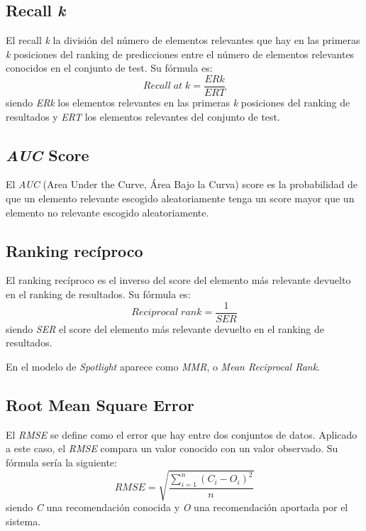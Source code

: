 \subsection{Recall \textit{k}}\label{recall-k}
El recall \textit{k} \cite{recall_at_k} la división del número de elementos relevantes que hay en las primeras \textit{k} posiciones del ranking de predicciones entre el número de elementos relevantes conocidos en el conjunto de test. Su fórmula es:
\begin{equation}
Recall\;at\;k = \frac{ERk}{ERT}
\end{equation}
siendo \textit{ERk} los elementos relevantes en las primeras \textit{k} posiciones del ranking de resultados y \textit{ERT} los elementos relevantes del conjunto de test.

\subsection{\textit{AUC} Score}\label{auc-score}
El \textit{AUC} (Area Under the Curve, Área Bajo la Curva) score \cite{auc_score} es la probabilidad de que un elemento relevante escogido aleatoriamente tenga un score mayor que un elemento no relevante escogido aleatoriamente.

\subsection{Ranking recíproco}\label{ranking-reciproco}
El ranking recíproco \cite{reciprocal_rank} es el inverso del score del elemento más relevante devuelto en el ranking de resultados. Su fórmula es:
\begin{equation}
Reciprocal\;rank = \frac{1}{SER}
\end{equation}
siendo \textit{SER} el score del elemento más relevante devuelto en el ranking de resultados.

En el modelo de \textit{Spotlight} aparece como \textit{MMR}, o \textit{Mean Reciprocal Rank}.

\subsection{Root Mean Square Error}\label{rmse}
El \textit{RMSE} se define como el error que hay entre dos conjuntos de datos. Aplicado a este caso, el \textit{RMSE} \cite{rmse} compara un valor conocido con un valor observado. Su fórmula sería la siguiente:
\begin{equation}
RMSE = \sqrt{\frac{\sum_{i=1}^n(C_{i} - O_{i})^{2}}{n}}
\end{equation}
siendo \textit{C} una recomendación conocida y \textit{O} una recomendación aportada por el sistema.

